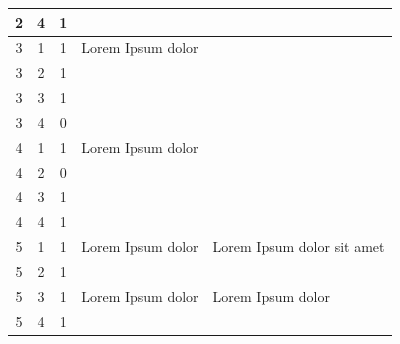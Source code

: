 \begin{landscape}
\begin{longtable}{|c|c|c|l|l|}
        2               & 4                      & 1               &                                                       &                                           \\ \hline
        3               & 1                      & 1               & Lorem Ipsum dolor                           &                                           \\ \hline
        3               & 2                      & 1               &                                                       &                                           \\ \hline
        3               & 3                      & 1               &                                                       &                                           \\ \hline
        3               & 4                      & 0               &                                                       &                                           \\ \hline
        4               & 1                      & 1               & Lorem Ipsum dolor                                      &                                           \\ \hline
        4               & 2                      & 0               &                                                       &                                           \\ \hline
        4               & 3                      & 1               &                                                       &                                           \\ \hline
        4               & 4                      & 1               &                                                       &                                           \\ \hline
        5               & 1                      & 1               & Lorem Ipsum dolor                       & Lorem Ipsum dolor sit amet        \\ \hline
        5               & 2                      & 1               &                                                       &                                           \\ \hline
        5               & 3                      & 1               & Lorem Ipsum dolor                       & Lorem Ipsum dolor         \\ \hline
        5               & 4                      & 1               &                                                       &                                           \\ \hline

\end{longtable}
\end{landscape}
